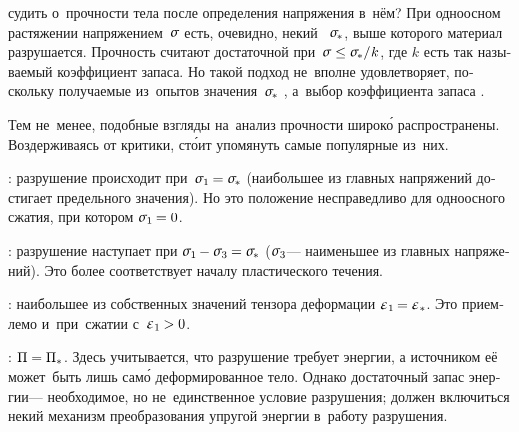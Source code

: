 \begin{otherlanguage}{russian}

 судить о~прочности тела после определения напряжения в~нём?
При одноосном растяжении напряжением~$\mathsigma$ есть, очевидно, некий ~${\tensilestrength}$, выше которого материал разрушается.
Прочность считают достаточной при~${\mathsigma \hspace{.1ex} \leq \tensilestrength / \hspace{.1ex} k}$, где $k$ есть так называемый коэффициент запаса.
Но такой подход не~вполне удовлетворяет, поскольку получаемые из~опытов значения~${\tensilestrength}$ , а~выбор коэффициента запаса .

Тем не~менее, подобные взгляды на~анализ прочности широк\'{о} распространены.
Воздерживаясь от критики, ст\'{о}ит упомянуть самые популярные из~них.


:
разрушение происходит при~${\mathsigma_1 \hspace{-0.15ex} = \tensilestrength}$ (наибольшее из главных напряжений достигает предельного значения).
Но это положение несправедливо для одноосного сжатия, при котором ${\mathsigma_1 \hspace{-0.15ex} = 0}$.

:
разрушение наступает при ${\mathsigma_1 \hspace{-0.15ex} - \mathsigma_3 \hspace{-0.1ex} = \tensilestrength}$ ($\mathsigma_3$\:--- наименьшее из главных напряжений).
Это более соответствует началу пластического течения.

: наибольшее из собственных значений тензора деформации ${\infinitesimaldeformationeigenvalue{1} \hspace{-0.2ex} = \infinitesimaldeformationeigenvalue{*}}$.
Это приемлемо и~при~сжатии с~${\infinitesimaldeformationeigenvalue{1} \hspace{-0.12ex} > 0}$.

:
${\Pi = \Pi_*}$.
Здесь учитывается, что разрушение требует энергии, а источником её может~быть лишь сам\'{о} деформированное тело.
Однако достаточный запас энергии\:--- необходимое, но не~единственное условие разрушения; должен включиться некий механизм преобразования упругой энергии в~работу разрушения.


\end{otherlanguage}
